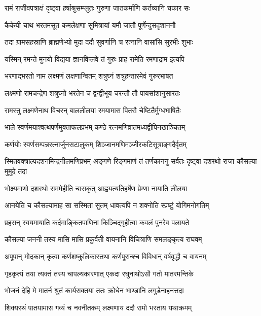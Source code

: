 \twolineshloka
{रामं राजीवपत्राक्षं दृष्ट्वा हर्षाश्रुसम्प्लुतः}
{गुरुणा जातकर्माणि कर्तव्यानि चकार सः} %

\twolineshloka
{कैकेयी चाथ भरतमसूत कमलेक्षणा}
{सुमित्रायां यमौ जातौ पूर्णेन्दुसदृशाननौ} %

\twolineshloka
{तदा ग्रामसहस्राणि ब्राह्मणेभ्यो मुदा ददौ}
{सुवर्णानि च रत्नानि वासांसि सुरभीः शुभाः} %

\twolineshloka
{यस्मिन् रमन्ते मुनयो विद्यया ज्ञानविप्लवे}
{तं गुरुः प्राह रामेति रमणाद्राम इत्यपि} %

\twolineshloka
{भरणाद्भरतो नाम लक्ष्मणं लक्षणान्वितम्}
{शत्रुघ्नं शत्रुहन्तारमेवं गुरुरभाषत} %

\twolineshloka
{लक्ष्मणो रामचन्द्रेण शत्रुघ्नो भरतेन च}
{द्वन्द्वीभूय चरन्तौ तौ पायसांशानुसारतः} %

\twolineshloka
{रामस्तु लक्ष्मणेनाथ विचरन् बाललीलया}
{रमयामास पितरौ चेष्टितैर्मुग्धभाषितैः} %

\twolineshloka
{भाले स्वर्णमयाश्वत्थपर्णमुक्ताफलप्रभम्}
{कण्ठे रत्नमणिव्रातमध्यद्वीपिनखाञ्चितम्} %

\twolineshloka
{कर्णयोः स्वर्णसम्पन्नरत्नार्जुनसटालुकम्}
{शिञ्जानमणिमञ्जीरकटिसूत्राङ्गदैर्वृतम्} %

\threelineshloka
{स्मितवक्त्राल्पदशनमिन्द्रनीलमणिप्रभम्}
{अङ्गणे रिङ्गमाणं तं तर्णकाननु सर्वतः}
{दृष्ट्वा दशरथो राजा कौसल्या मुमुदे तदा} %

\twolineshloka
{भोक्ष्यमाणो दशरथो राममेहीति चासकृत्}
{आह्वयत्यतिहर्षेण प्रेम्णा नायाति लीलया} %

\twolineshloka
{आनयेति च कौसल्यामाह सा सस्मिता सुतम्}
{धावत्यपि न शक्नोति स्प्रष्टुं योगिमनोगतिम्} %

\twolineshloka
{प्रहसन् स्वयमायाति कर्दमाङ्कितपाणिना}
{किञ्चिद्गृहीत्वा कवलं पुनरेव पलायते} %

\twolineshloka
{कौसल्या जननी तस्य मासि मासि प्रकुर्वती}
{वायनानि विचित्राणि समलङ्कृत्य राघवम्} %

\twolineshloka
{अपूपान् मोदकान् कृत्वा कर्णशष्कुलिकास्तथा}
{कर्णपूरान्श्च विविधान् वर्षवृद्धौ च वायनम्} %

\twolineshloka
{गृहकृत्यं तया त्यक्तं तस्य चापल्यकारणात्}
{एकदा रघुनाथोऽसौ गतो मातरमन्तिके} %

\twolineshloka
{भोजनं देहि मे मातर्न श्रुतं कार्यसक्तया}
{ततः क्रोधेन भाण्डानि लगुडेनाहनत्तदा} %

\twolineshloka
{शिक्यस्थं पातयामास गव्यं च नवनीतकम्}
{लक्ष्मणाय ददौ रामो भरताय यथाक्रमम्} %

